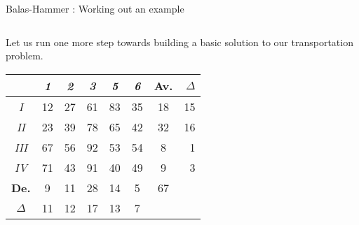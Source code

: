 \documentclass[32pt,aspectratio=169]{beamer}
\begin{document}
\begin{frame}{Balas-Hammer : Working out an example}
  \begin{columns}
    \begin{column}{.6\textwidth}
      \vfill
      
      Let us run one more step towards building a basic solution to
      our transportation problem.
      \vspace{1.3\baselineskip}

      \begin{overlayarea}{\textwidth}{.5\textheight}      
        \vspace{.22cm}
        \small{
          \begin{tabular}{c|c|c|c|c|c|c|r}
            & \textit{1} & \textit{2} & \cellcolor{orange}\textit{3} & \textit{5} & \textit{6} & \cellcolor{blue!50}\textbf{Av.} & \color{blue}$\Delta$ \\
            \hline
            \textit{I} & \cellcolor{orange}12 & \cellcolor{orange}27 & \cellcolor{orange}61 & \cellcolor{orange}83 & \cellcolor{orange}35 & \cellcolor{blue!50}18 & \color{blue}15 \\
            \hline 
            \textit{II} & \cellcolor{blue!25}23 & \cellcolor{blue!25}39 & \cellcolor{orange}78 &  \cellcolor{blue!25}65 & \cellcolor{blue!25}42 & \cellcolor{blue!50}32 & \color{blue}16\\
            \hline
            \textit{III} & \cellcolor{blue!25}67 & \cellcolor{blue!25}56 & \cellcolor{orange}92 & \cellcolor{blue!25}53 & \cellcolor{blue!25}54 & \cellcolor{blue!50}8 & \color{blue}1\\
            \hline
            \textit{IV} & \cellcolor{blue!25}71 & \cellcolor{blue!25}43 & \cellcolor{orange}91 & \cellcolor{blue!25}40 & \cellcolor{blue!25}49 & \cellcolor{blue!50}9 & \color{blue}3\\
            \hline 
            \cellcolor{blue!50}\textbf{De.} & \cellcolor{blue!50}9 & \cellcolor{blue!50}11 & \cellcolor{blue!50}28 & \cellcolor{blue!50}14 & \cellcolor{blue!50}5 & \cellcolor{blue!60}67  \\
            \cline{1-7}
            \color{blue}$\Delta$ & \color{blue}11 & \color{blue}12 & \cellcolor{orange}\color{blue}17 & \color{blue}13 & \color{blue}7
          \end{tabular}
        }
        

\end{overlayarea}
\end{column}
\end{columns}
\end{frame}
\end{document}
